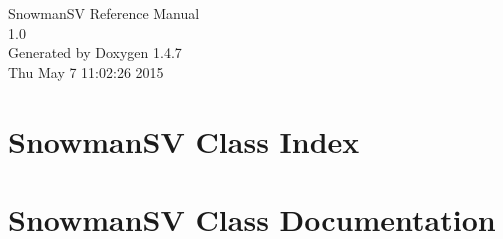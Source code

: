 \documentclass[a4paper]{book}
\begin{document}
\begin{titlepage}
\vspace*{7cm}
\begin{center}
{\Large Snowman\-SV Reference Manual\\[1ex]\large 1.0 }\\
\vspace*{1cm}
{\large Generated by Doxygen 1.4.7}\\
\vspace*{0.5cm}
{\small Thu May 7 11:02:26 2015}\\
\end{center}
\end{titlepage}
\clearemptydoublepage
{}
\tableofcontents
\clearemptydoublepage
{}
\chapter{Snowman\-SV Class Index}

\chapter{Snowman\-SV Class Documentation}








\printindex
\end{document}
